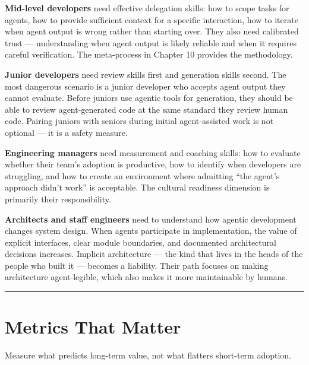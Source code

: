 \documentclass[
  a4paper,
  DIV=11,
  numbers=noendperiod]{scrreprt}
\begin{document}
\textbf{Mid-level developers} need effective delegation skills: how to
scope tasks for agents, how to provide sufficient context for a specific
interaction, how to iterate when agent output is wrong rather than
starting over. They also need calibrated trust --- understanding when
agent output is likely reliable and when it requires careful
verification. The meta-process in Chapter 10 provides the methodology.

\textbf{Junior developers} need review skills first and generation
skills second. The most dangerous scenario is a junior developer who
accepts agent output they cannot evaluate. Before juniors use agentic
tools for generation, they should be able to review agent-generated code
at the same standard they review human code. Pairing juniors with
seniors during initial agent-assisted work is not optional --- it is a
safety measure.

\textbf{Engineering managers} need measurement and coaching skills: how
to evaluate whether their team's adoption is productive, how to identify
when developers are struggling, and how to create an environment where
admitting ``the agent's approach didn't work'' is acceptable. The
cultural readiness dimension is primarily their responsibility.

\textbf{Architects and staff engineers} need to understand how agentic
development changes system design. When agents participate in
implementation, the value of explicit interfaces, clear module
boundaries, and documented architectural decisions increases. Implicit
architecture --- the kind that lives in the heads of the people who
built it --- becomes a liability. Their path focuses on making
architecture agent-legible, which also makes it more maintainable by
humans.

\begin{center}\rule{0.5\linewidth}{0.5pt}\end{center}

\section{Metrics That Matter}\label{metrics-that-matter}

Measure what predicts long-term value, not what flatters short-term
adoption.
\end{document}
